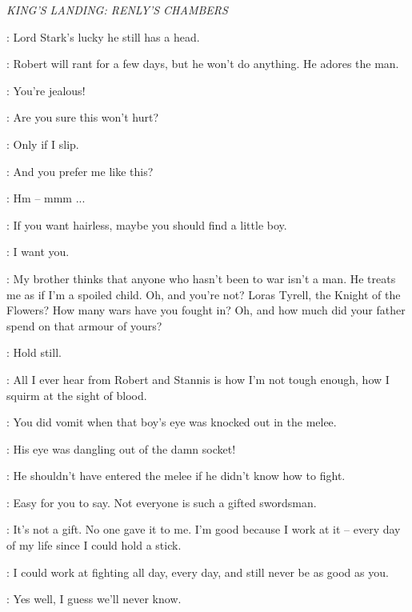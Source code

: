 
\scene

\textit{KING'S LANDING: RENLY'S CHAMBERS} 


\LORAS: Lord Stark's lucky he still has a head. 

\RENLY: Robert will rant for a few days, but he won't do anything. He adores the man. 

\LORAS: You're jealous! 

\RENLY: Are you sure this won't hurt? 

\LORAS: Only if I slip. 

\RENLY: And you prefer me like this? 

\LORAS: Hm -- mmm ...

\RENLY: If you want hairless, maybe you should find a little boy. 

\LORAS: I want you. 

\RENLY: My brother thinks that anyone who hasn't been to war isn't a man. He treats me as if I'm a spoiled child.  Oh, and you're not? Loras Tyrell, the Knight of the Flowers? How many wars have you fought in? Oh, and how much did your father spend on that armour of yours? 

\LORAS: Hold still. 

\RENLY: All I ever hear from Robert and Stannis is how I'm not tough enough, how I squirm at the sight of blood. 

\LORAS: You did vomit when that boy's eye was knocked out in the melee. 

\RENLY: His eye was dangling out of the damn socket! 

\LORAS: He shouldn't have entered the melee if he didn't know how to fight. 

\RENLY: Easy for you to say. Not everyone is such a gifted swordsman. 

\LORAS: It's not a gift. No one gave it to me. I'm good because I work at it -- every day of my life since I could hold a stick. 

\RENLY: I could work at fighting all day, every day, and still never be as good as you. 

\LORAS: Yes well, I guess we'll never know. 

